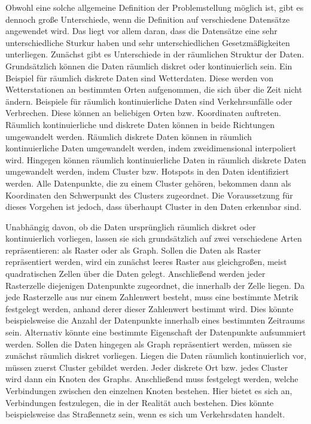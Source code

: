 Obwohl eine solche allgemeine Definition der Problemstellung möglich ist, gibt es dennoch große Unterschiede, wenn die Definition auf verschiedene Datensätze angewendet wird.
Das liegt vor allem daran, dass die Datensätze eine sehr unterschiedliche Sturkur haben und sehr unterschiedlichen Gesetzmäßigkeiten unterliegen.
Zunächst gibt es Unterschiede in der räumlichen Struktur der Daten.
Grundsätzlich können die Daten räumlich diskret oder kontinuierlich sein.
Ein Beispiel für räumlich diskrete Daten sind Wetterdaten.
Diese werden von Wetterstationen an bestimmten Orten aufgenommen, die sich über die Zeit nicht ändern.
Beispiele für räumlich kontinuierliche Daten sind Verkehrsunfälle oder Verbrechen.
Diese können an beliebigen Orten bzw. Koordinaten auftreten.
Räumlich kontinuierliche und diskrete Daten können in beide Richtungen umgewandelt werden.
Räumlich diskrete Daten können in räumlich kontinuierliche Daten umgewandelt werden, indem zweidimensional interpoliert wird.
Hingegen können räumlich kontinuierliche Daten in räumlich diskrete Daten umgewandelt werden, indem Cluster bzw. Hotspots in den Daten identifiziert werden.
Alle Datenpunkte, die zu einem Cluster gehören, bekommen dann als Koordinaten den Schwerpunkt des Clusters zugeordnet.
Die Voraussetzung für dieses Vorgehen ist jedoch, dass überhaupt Cluster in den Daten erkennbar sind.

Unabhängig davon, ob die Daten ursprünglich räumlich diskret oder kontinuierlich vorliegen, lassen sie sich grundsätzlich auf zwei verschiedene Arten repräsentieren: als Raster oder als Graph.
Sollen die Daten als Raster repräsentiert werden, wird ein zunächst leeres Raster aus gleichgroßen, meist quadratischen Zellen über die Daten gelegt.
Anschließend werden jeder Rasterzelle diejenigen Datenpunkte zugeordnet, die innerhalb der Zelle liegen.
Da jede Rasterzelle aus nur einem Zahlenwert besteht, muss eine bestimmte Metrik festgelegt werden, anhand derer dieser Zahlenwert bestimmt wird.
Dies könnte beispielsweise die Anzahl der Datenpunkte innerhalb eines bestimmten Zeitraums sein.
Alternativ könnte eine bestimmte Eigenschaft der Datenpunkte aufsummiert werden.
Sollen die Daten hingegen als Graph repräsentiert werden, müssen sie zunächst räumlich diskret vorliegen.
Liegen die Daten räumlich kontinuierlich vor, müssen zuerst Cluster gebildet werden.
Jeder diskrete Ort bzw. jedes Cluster wird dann ein Knoten des Graphs.
Anschließend muss festgelegt werden, welche Verbindungen zwischen den einzelnen Knoten bestehen.
Hier bietet es sich an, Verbindungen festzulegen, die in der Realität auch bestehen.
Dies könnte beispielsweise das Straßennetz sein, wenn es sich um Verkehrsdaten handelt.

